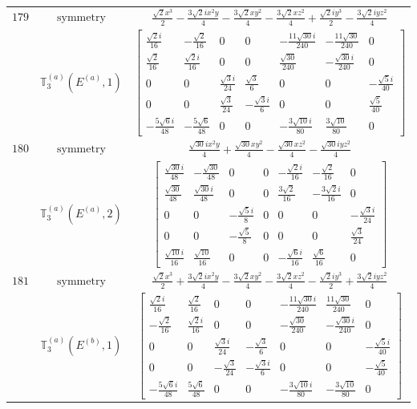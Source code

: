 \documentclass[fleqn,8pt,landscape]{jsarticle}
\begin{document}
\begin{longtable}{ccc}
$ 179 $ & $ \text{symmetry} $ & $ \frac{\sqrt{2} x^{3}}{2} - \frac{3 \sqrt{2} i x^{2} y}{4} - \frac{3 \sqrt{2} x y^{2}}{4} - \frac{3 \sqrt{2} x z^{2}}{4} + \frac{\sqrt{2} i y^{3}}{2} - \frac{3 \sqrt{2} i y z^{2}}{4} $ \\
$  $ & $ \mathbb{T}_{3}^{(a)}(E^{(a)},1) $ & $ \begin{bmatrix} \frac{\sqrt{2} i}{16} & - \frac{\sqrt{2}}{16} & 0 & 0 & - \frac{11 \sqrt{30} i}{240} & - \frac{11 \sqrt{30}}{240} & 0 \\ \frac{\sqrt{2}}{16} & \frac{\sqrt{2} i}{16} & 0 & 0 & \frac{\sqrt{30}}{240} & - \frac{\sqrt{30} i}{240} & 0 \\ 0 & 0 & \frac{\sqrt{3} i}{24} & \frac{\sqrt{3}}{6} & 0 & 0 & - \frac{\sqrt{5} i}{40} \\ 0 & 0 & \frac{\sqrt{3}}{24} & - \frac{\sqrt{3} i}{6} & 0 & 0 & \frac{\sqrt{5}}{40} \\ - \frac{5 \sqrt{6} i}{48} & - \frac{5 \sqrt{6}}{48} & 0 & 0 & - \frac{3 \sqrt{10} i}{80} & \frac{3 \sqrt{10}}{80} & 0 \end{bmatrix} $ \\ \hline
$ 180 $ & $ \text{symmetry} $ & $ \frac{\sqrt{30} i x^{2} y}{4} + \frac{\sqrt{30} x y^{2}}{4} - \frac{\sqrt{30} x z^{2}}{4} - \frac{\sqrt{30} i y z^{2}}{4} $ \\
$  $ & $ \mathbb{T}_{3}^{(a)}(E^{(a)},2) $ & $ \begin{bmatrix} \frac{\sqrt{30} i}{48} & - \frac{\sqrt{30}}{48} & 0 & 0 & - \frac{\sqrt{2} i}{16} & - \frac{\sqrt{2}}{16} & 0 \\ \frac{\sqrt{30}}{48} & \frac{\sqrt{30} i}{48} & 0 & 0 & \frac{3 \sqrt{2}}{16} & - \frac{3 \sqrt{2} i}{16} & 0 \\ 0 & 0 & - \frac{\sqrt{5} i}{8} & 0 & 0 & 0 & - \frac{\sqrt{3} i}{24} \\ 0 & 0 & - \frac{\sqrt{5}}{8} & 0 & 0 & 0 & \frac{\sqrt{3}}{24} \\ \frac{\sqrt{10} i}{16} & \frac{\sqrt{10}}{16} & 0 & 0 & - \frac{\sqrt{6} i}{16} & \frac{\sqrt{6}}{16} & 0 \end{bmatrix} $ \\ \hline
$ 181 $ & $ \text{symmetry} $ & $ \frac{\sqrt{2} x^{3}}{2} + \frac{3 \sqrt{2} i x^{2} y}{4} - \frac{3 \sqrt{2} x y^{2}}{4} - \frac{3 \sqrt{2} x z^{2}}{4} - \frac{\sqrt{2} i y^{3}}{2} + \frac{3 \sqrt{2} i y z^{2}}{4} $ \\
$  $ & $ \mathbb{T}_{3}^{(a)}(E^{(b)},1) $ & $ \begin{bmatrix} \frac{\sqrt{2} i}{16} & \frac{\sqrt{2}}{16} & 0 & 0 & - \frac{11 \sqrt{30} i}{240} & \frac{11 \sqrt{30}}{240} & 0 \\ - \frac{\sqrt{2}}{16} & \frac{\sqrt{2} i}{16} & 0 & 0 & - \frac{\sqrt{30}}{240} & - \frac{\sqrt{30} i}{240} & 0 \\ 0 & 0 & \frac{\sqrt{3} i}{24} & - \frac{\sqrt{3}}{6} & 0 & 0 & - \frac{\sqrt{5} i}{40} \\ 0 & 0 & - \frac{\sqrt{3}}{24} & - \frac{\sqrt{3} i}{6} & 0 & 0 & - \frac{\sqrt{5}}{40} \\ - \frac{5 \sqrt{6} i}{48} & \frac{5 \sqrt{6}}{48} & 0 & 0 & - \frac{3 \sqrt{10} i}{80} & - \frac{3 \sqrt{10}}{80} & 0 \end{bmatrix} $ \\ \hline

\end{longtable}
\end{document}
